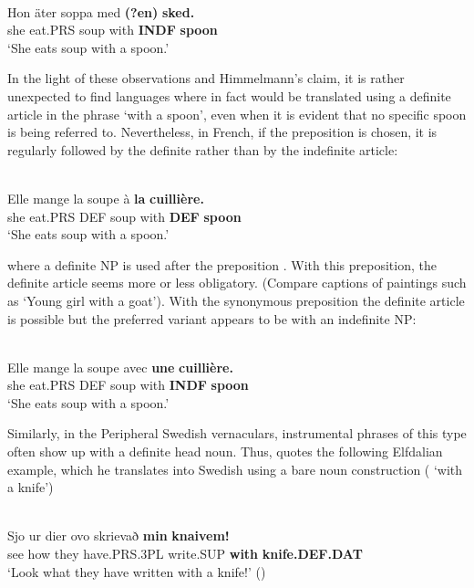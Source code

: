 \ea \label{} 
\\
\gll Hon  äter  soppa  med  \textbf{(?en)} \textbf{  sked.}\\
she  eat.PRS  soup  with  \textbf{INDF} \textbf{spoon}\\
\glt ‘She eats soup with a spoon.’

\z

In the light of these observations and Himmelmann’s claim, it is rather unexpected to find languages where in fact  would be translated using a definite article in the phrase ‘with a spoon’, even when it is evident that no specific spoon is being referred to. Nevertheless, in French, if the preposition  is chosen, it is regularly followed by the definite rather than by the indefinite article:

\ea \label{} 
\\
\gll Elle  mange  la  soupe  à  \textbf{la} \textbf{cuillière.}\\
she  eat.PRS  DEF  soup  with  \textbf{DEF} \textbf{spoon}\\
\glt ‘She eats soup with a spoon.’

\z

where a definite NP is used after the preposition . With this preposition, the definite article seems more or less obligatory. (Compare captions of paintings such as  ‘Young girl with a goat’). With the synonymous preposition  the definite article is possible but the preferred variant appears to be with an indefinite NP:

\ea \label{} 
\\
\gll Elle  mange  la  soupe  avec  \textbf{une} \textbf{cuillière.}\\
she  eat.PRS  DEF  soup  with  \textbf{INDF} \textbf{spoon}\\
\glt ‘She eats soup with a spoon.’

\z

Similarly, in the Peripheral Swedish vernaculars, instrumental phrases of this type often show up with a definite head noun. Thus, \citet[126]{Levander1909} quotes the following Elfdalian example, which he translates into Swedish using a bare noun construction ( ‘with a knife’)

\ea \label{} 
\\
\gll Sjo  ur  dier  ovo  skrievað  \textbf{min} \textbf{  knaivem!}\\
see  how  they  have.PRS.3PL  write.SUP  \textbf{with} \textbf{knife.DEF.DAT}\\
\glt ‘Look what they have written with a knife!’ (\citet[125]{Levander1909})

